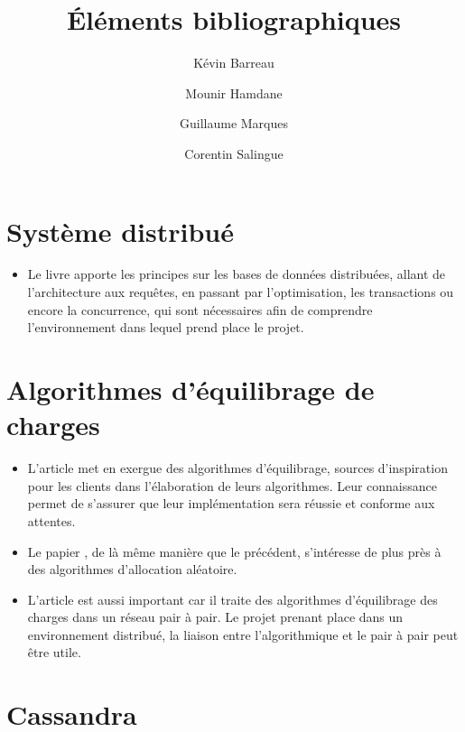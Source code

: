 \documentclass[12 pt]{article}
\title{Éléments bibliographiques}
\author{Kévin Barreau \and Mounir Hamdane \and Guillaume Marques \and Corentin Salingue}
\begin{document}
\maketitle
\section{Système distribué}

\begin{itemize}
\item Le livre \cite{Ozsu2011} apporte les principes sur les bases de données distribuées, allant de l'architecture aux requêtes, en passant par l'optimisation, les transactions ou encore la concurrence, qui sont nécessaires afin de comprendre l'environnement dans lequel prend place le projet.
\end{itemize}

\section{Algorithmes d'équilibrage de charges}

\begin{itemize}
\item L'article \cite{BalancedAlloc99} met en exergue des algorithmes d'équilibrage, sources d'inspiration pour les clients dans l'élaboration de leurs algorithmes. Leur connaissance permet de s'assurer que leur implémentation sera réussie et conforme aux attentes.

\item Le papier \cite{RandomChoices05}, de là même manière que le précédent, s'intéresse de plus près à des algorithmes d'allocation aléatoire.

\item L'article \cite{LoadBalancingPeertoPeer14} est aussi important car il traite des algorithmes d'équilibrage des charges dans un réseau pair à pair. Le projet prenant place dans un environnement distribué, la liaison entre l'algorithmique et le pair à pair peut être utile. 
\end{itemize}

\section{Cassandra}
\end{document}
